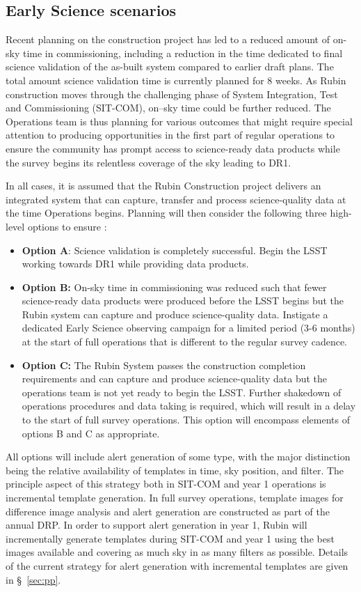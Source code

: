 \subsection{Early Science scenarios } \label{ssec:scenarios}

Recent planning on the construction project has led to a reduced amount of on-sky time in commissioning, including a reduction in the time dedicated to final science validation of the as-built system compared to earlier draft plans.
The total amount science validation time is currently planned for 8 weeks.
As Rubin construction moves through the challenging phase of System Integration, Test and Commissioning (SIT-COM), on--sky time could be further reduced. 
The Operations team is thus planning for various outcomes that might require special attention to producing \es opportunities in the first part of regular operations to ensure the community has prompt access to science-ready data products while the survey begins its relentless coverage of the sky leading to DR1.

In all cases, it is assumed that the Rubin Construction project delivers an integrated system that can capture, transfer and process science-quality data at the time Operations begins.
Planning will then consider the following three high-level options to ensure \es:
\begin{itemize}
\item \textbf{Option A}: 
Science validation is completely successful.
Begin the LSST working towards DR1 while providing \es data products. 
\item \textbf{Option B:} 
On-sky time in commissioning was reduced such that fewer science-ready data products were produced before the LSST begins but the Rubin system can capture and produce science-quality data. 
Instigate a dedicated Early Science observing campaign for a limited period (3-6 months) at the start of full operations that is different to the regular survey cadence. 
\item \textbf{Option C:} 
The Rubin System  passes the construction completion requirements and can capture and produce science-quality data but the operations team is not yet ready to begin the LSST. 
Further shakedown of operations procedures and data taking is required, which will result in a delay to the start of full survey operations. 
This option will encompass elements of options B and C as appropriate. 
\end{itemize}

All options will include alert generation of some type, with the major distinction being the relative availability of templates in time, sky position, and filter. 
The principle aspect of this strategy both  in SIT-COM and year 1 operations is incremental template generation. 
In full survey operations, template images for difference image analysis and alert generation are constructed as part of the annual DRP. 
In order to support alert generation in year 1, Rubin will incrementally generate templates during SIT-COM and year 1 using the best images available and covering as much sky  in as many filters as possible. 
Details of the current strategy for alert generation  with incremental templates are given in  \S~\ref{sec:pp}.  

